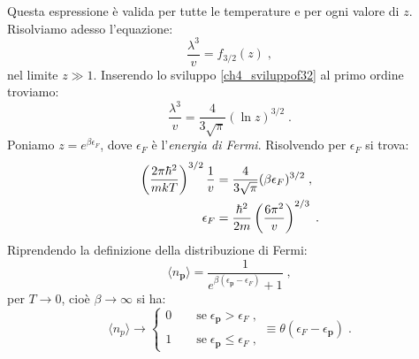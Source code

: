 \documentclass[10pt,a4paper]{report}
\theoremstyle{definition}
\numberwithin{equation}{section}
\newcommand{\bra}{\langle}
\newcommand{\ket}{\rangle}
\begin{document}
Questa espressione è valida per tutte le temperature e per ogni valore di $z$. Risolviamo adesso l'equazione:
$$
\frac{\lambda^3}{v}=f_{3/2}(z)\;,
$$
nel limite $z\gg 1$. Inserendo lo sviluppo \eqref{ch4_sviluppof32} al primo ordine troviamo:
\begin{equation}
\frac{\lambda^3}{v}=\frac{4}{3\sqrt{\pi}}(\ln z)^{3/2}\;.
\end{equation}
Poniamo $z=e^{\beta\epsilon_F}$, dove $\epsilon_F$ è l'\emph{energia di Fermi}. Risolvendo per $\epsilon_F$ si trova:
\begin{align}
\left(\frac{2\pi\hbar^2}{mkT}\right)^{3/2}\frac{1}{v}&=\frac{4}{3\sqrt{\pi}}(\beta\epsilon_F)^{3/2} \notag\;, \\
\epsilon_F &= \frac{\hbar^2}{2m}\left(\frac{6\pi^2}{v}\right)^{2/3}\;.
\end{align}
Riprendendo la definizione della distribuzione di Fermi:
$$
\bra n_{\mathbf{p}}\ket =\frac{1}{e^{\beta(\epsilon_{\mathbf{p}}-\epsilon_F)}+1}\;,
$$
per $T\to 0$, cioè $\beta\to\infty$ si ha:
\begin{equation}
\bra n_p\ket \longrightarrow \begin{cases}
0\qquad \mbox{se}\; \epsilon_{\mathbf{p}}>\epsilon_F\;, \\
\\
1\qquad \mbox{se}\; \epsilon_{\mathbf{p}}\le \epsilon_F\;,
\end{cases}\equiv \theta(\epsilon_F-\epsilon_{\mathbf{p}})\;.
\end{equation}
\end{document}

